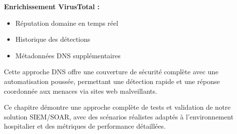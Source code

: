 \textbf{Enrichissement VirusTotal :}
\begin{itemize}
    \item Réputation domaine en temps réel
    \item Historique des détections
    \item Métadonnées DNS supplémentaires
\end{itemize}

Cette approche DNS offre une couverture de sécurité complète avec une automatisation poussée, permettant une détection rapide et une réponse coordonnée aux menaces via sites web malveillants.

Ce chapitre démontre une approche complète de tests et validation de notre solution SIEM/SOAR, avec des scénarios réalistes adaptés à l'environnement hospitalier et des métriques de performance détaillées.
